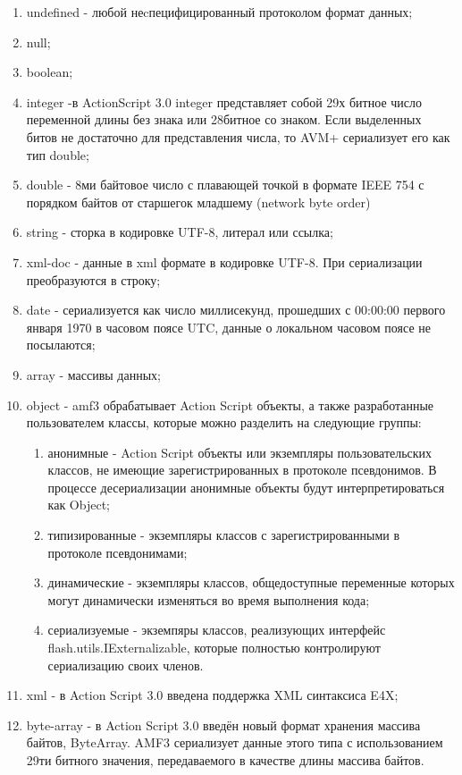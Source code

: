 \begin{enumerate}
\item undefined - любой неcпецифицированный протоколом формат данных;
\item null;
\item boolean;
\item integer -в ActionScript 3.0 integer представляет собой 29х битное число переменной длины без знака или 28битное 
со знаком. Если выделенных битов не достаточно для представления числа, то AVM+ сериализует его как тип double;
\item double - 8ми байтовое число с плавающей точкой в формате IEEE 754 с порядком байтов от старшегок младшему 
(network byte order)
\item string - сторка в кодировке UTF-8, литерал или ссылка;
\item xml-doc - данные в xml формате в кодировке UTF-8. При сериализации преобразуются в строку;
\item date - сериализуется как число миллисекунд, прошедших с 00:00:00 первого января 1970 в часовом поясе UTC, 
данные о локальном часовом поясе не посылаются;
\item array - массивы данных;
\item object - amf3 обрабатывает Action Script объекты, а также разработанные пользователем классы, которые можно 
разделить на следующие группы:
\begin{enumerate}
\item анонимные - Action Script объекты или экземпляры пользовательских классов, не имеющие зарегистрированных в 
протоколе псевдонимов. В процессе десериализации анонимные объекты будут интерпретироваться как Object;
\item типизированные - экземпляры классов с зарегистрированными в протоколе псевдонимами;
\item динамические - экземпляры классов, общедоступные переменные которых могут динамически изменяться во время 
выполнения кода;
\item сериализуемые - экземпяры классов, реализующих интерфейс flash.utils.IExternalizable, которые полностью 
контролируют сериализацию своих членов.
\end{enumerate}
\item xml - в Action Script 3.0 введена поддержка XML синтаксиса E4X;
\item byte-array - в Action Script 3.0 введён новый формат хранения массива байтов, ByteArray. AMF3 сериализует 
данные этого типа с использованием 29ти битного значения, передаваемого в качестве длины массива байтов.
\end{enumerate} 

